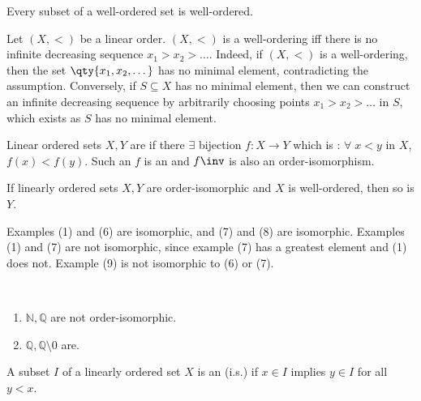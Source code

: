 \begin{note}
    Every subset of a well-ordered set is well-ordered.
\end{note}

\begin{remark}
    Let $(X, <)$ be a linear order.
    $(X, <)$ is a well-ordering iff there is no infinite decreasing sequence $x_1 > x_2 > \dots$.
    Indeed, if $(X, <)$ is a well-ordering, then the set $\qty{x_1, x_2, \dots}$ has no minimal element, contradicting the assumption.
    Conversely, if $S \subseteq X$ has no minimal element, then we can construct an infinite decreasing sequence by arbitrarily choosing points $x_1 > x_2 > \dots$ in $S$, which exists as $S$ has no minimal element.
\end{remark}

\begin{definition}
    Linear ordered sets $X, Y$ are  if there $\exists$ bijection $f : X \to Y$ which is : $\forall \; x < y$ in $X$, $f(x) < f(y)$.
    Such an $f$ is an  and $f\inv$ is also an order-isomorphism.
\end{definition}

\begin{note}
    If linearly ordered sets $X, Y$ are order-isomorphic and $X$ is well-ordered, then so is $Y$.
\end{note}

Examples (1) and (6) are isomorphic, and (7) and (8) are isomorphic.
Examples (1) and (7) are not isomorphic, since example (7) has a greatest element and (1) does not.
Example (9) is not isomorphic to (6) or (7).

\begin{example} ~\vspace*{-1.5\baselineskip}
    \begin{enumerate}
        \item $\mathbb{N}, \mathbb{Q}$ are not order-isomorphic.
        \item $\mathbb{Q}, \mathbb{Q} \setminus \qty{0}$ are.
    \end{enumerate}
\end{example}

\begin{definition}
    A subset $I$ of a linearly ordered set $X$ is an  (i.s.) if $x \in I$ implies $y \in I$ for all $y < x$.
\end{definition}

